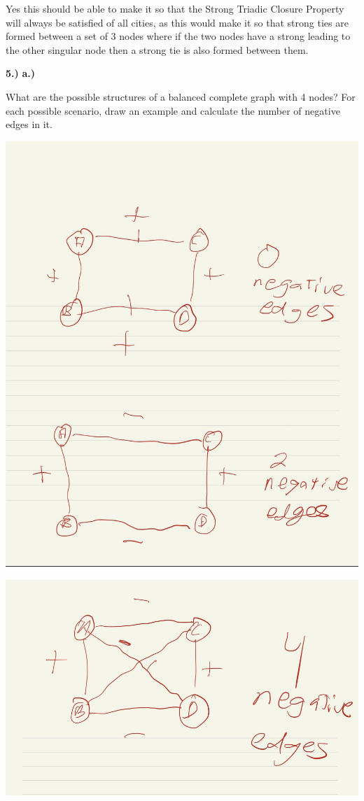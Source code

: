 \documentclass[
]{article}
\begin{document}
Yes this should be able to make it so that the Strong Triadic Closure
Property will always be satisfied of all cities, as this would make it
so that strong ties are formed between a set of 3 nodes where if the two
nodes have a strong leading to the other singular node then a strong tie
is also formed between them.

\textbf{5.)} \textbf{a.)}

What are the possible structures of a balanced complete graph with 4
nodes? For each possible scenario, draw an example and calculate the
number of negative edges in it.

\includegraphics{graph4.jpg}

\includegraphics{graph5.jpg}
\end{document}
